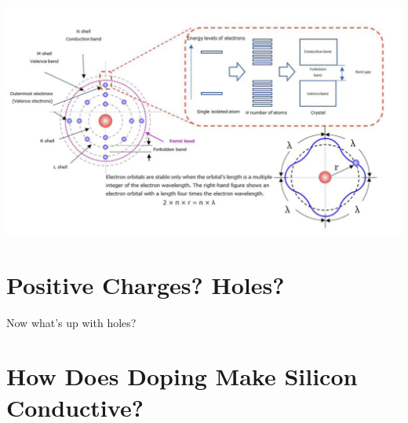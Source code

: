 \documentclass{article}
\begin{document}
		\begin{center}
			\includegraphics[width=\textwidth]{img/bohr_model_and_energy_bands.png}
		\end{center}
	\section{Positive Charges? Holes?}
		Now what's up with holes? 
	\section{How Does Doping Make Silicon Conductive?}
\end{document}
